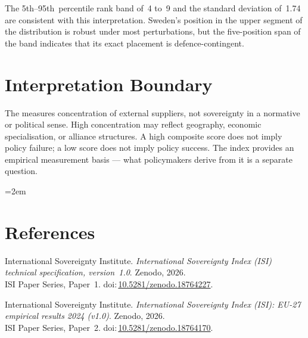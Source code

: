 \documentclass[12pt,a4paper]{article}
\begin{document}
The 5th--95th~percentile rank band of~4 to~9 and the standard deviation of~1.74 are consistent with this interpretation.  Sweden's position in the upper segment of the distribution is robust under most perturbations, but the five-position span of the band indicates that its exact placement is defence-contingent.


\section{Interpretation Boundary}
\label{sec:interpretation}

The \ISI measures concentration of external suppliers, not sovereignty in a normative or political sense.  High concentration may reflect geography, economic specialisation, or alliance structures.  A high composite score does not imply policy failure; a low score does not imply policy success.  The index provides an empirical measurement basis --- what policymakers derive from it is a separate question.


\clearpage
\vspace*{1.5cm}

\begingroup\emergencystretch=2em
\section*{References}

\begin{enumerate}[label={[\arabic*]},leftmargin=2em,itemsep=6pt]
\item International Sovereignty Institute.
  \textit{International Sovereignty Index (ISI) technical specification, version~1.0}.
  Zenodo, 2026.\\ISI Paper Series, Paper~1.
  doi:\,\href{https://doi.org/10.5281/zenodo.18764227}{10.5281/zenodo.18764227}.

\item International Sovereignty Institute.
  \textit{International Sovereignty Index (ISI): EU-27 empirical results 2024 (v1.0)}.
  Zenodo, 2026.\\ISI Paper Series, Paper~2.
  doi:\,\href{https://doi.org/10.5281/zenodo.18764170}{10.5281/zenodo.18764170}.
\end{enumerate}
\endgroup
\end{document}

